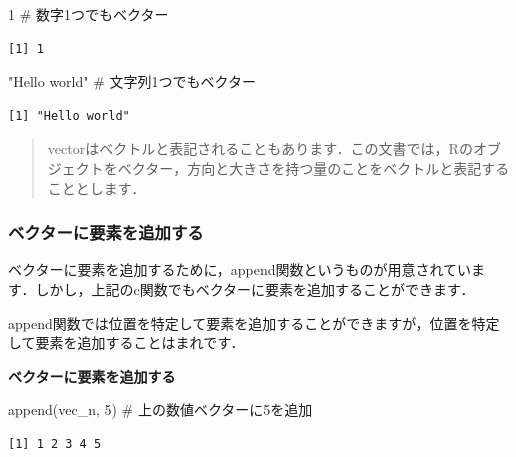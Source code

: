 \documentclass[
  letterpaper,
  DIV=11,
  numbers=noendperiod]{scrreprt}
\newenvironment{Shaded}{\begin{snugshade}}{\end{snugshade}}
\newcommand{\CommentTok}[1]{\textcolor[rgb]{0.37,0.37,0.37}{#1}}
\newcommand{\DecValTok}[1]{\textcolor[rgb]{0.68,0.00,0.00}{#1}}
\newcommand{\FunctionTok}[1]{\textcolor[rgb]{0.28,0.35,0.67}{#1}}
\newcommand{\NormalTok}[1]{\textcolor[rgb]{0.00,0.23,0.31}{#1}}
\newcommand{\StringTok}[1]{\textcolor[rgb]{0.13,0.47,0.30}{#1}}
\begin{document}
\begin{Shaded}
\begin{Highlighting}[]
\DecValTok{1} \CommentTok{\# 数字1つでもベクター}
\end{Highlighting}
\end{Shaded}

\begin{verbatim}
[1] 1
\end{verbatim}

\begin{Shaded}
\begin{Highlighting}[]
\StringTok{"Hello world"} \CommentTok{\# 文字列1つでもベクター}
\end{Highlighting}
\end{Shaded}

\begin{verbatim}
[1] "Hello world"
\end{verbatim}

\begin{quote}
vectorはベクトルと表記されることもあります．この文書では，Rのオブジェクトをベクター，方向と大きさを持つ量のことをベクトルと表記することとします．
\end{quote}

\hypertarget{ux30d9ux30afux30bfux30fcux306bux8981ux7d20ux3092ux8ffdux52a0ux3059ux308b}{%
\subsubsection{ベクターに要素を追加する}\label{ux30d9ux30afux30bfux30fcux306bux8981ux7d20ux3092ux8ffdux52a0ux3059ux308b}}

ベクターに要素を追加するために，append関数というものが用意されています．しかし，上記のc関数でもベクターに要素を追加することができます．

append関数では位置を特定して要素を追加することができますが，位置を特定して要素を追加することはまれです．

\textbf{ベクターに要素を追加する}

\begin{Shaded}
\begin{Highlighting}[]
\FunctionTok{append}\NormalTok{(vec\_n, }\DecValTok{5}\NormalTok{) }\CommentTok{\# 上の数値ベクターに5を追加}
\end{Highlighting}
\end{Shaded}

\begin{verbatim}
[1] 1 2 3 4 5
\end{verbatim}
\end{document}
